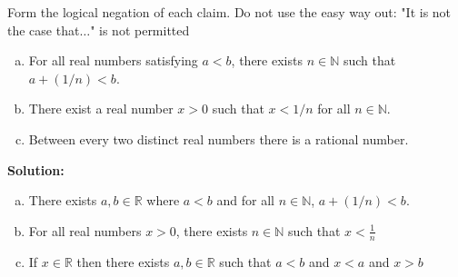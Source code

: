 \documentclass[12pt]{article}
\makeatletter
\theoremstyle{homework}
\newenvironment{exercise}[1]
{\def\@currentlabel{#1}\exercisecore}
{\endexercisecore}
\newcommand{\localhead}[1]{\par\smallskip\noindent\textbf{#1}\nobreak\\}%
\newcommand\solution{\localhead{Solution:}}
\newcommand{\Reals}{\ensuremath{\mathbb R}}
\newcommand{\Nats}{\ensuremath{\mathbb N}}
\let\RR\Reals
\let\NN\Nats
\makeatother
\begin{document}
\begin{exercise}{1.2.11}
  Form the logical negation of each claim. Do not use the easy way out: "It is not the case that$\ldots$" 
  is not permitted
  \begin{enumerate}[(a)]
  \item For all real numbers satisfying $a<b$, there exists $n\in\Nats$ such that $a+(1/n)<b$.
  \item There exist a real number $x>0$ such that $x<1/n$ for all $n\in\Nats$.
  \item Between every two distinct real numbers there is a rational number.
  \end{enumerate}
  \end{exercise}
  \solution
  \begin{enumerate}[(a)]
  \item There exists $a,b \in \RR$ where $a<b$ and for all $n \in \Nats$, $a+(1/n)<b$.
  \item For all real numbers $x > 0$, there exists $n \in \NN$ such that $x < \frac{1}{n}$
  \item If $x \in \RR$ then there exists $a,b \in \RR$ such that $a<b$ and $x < a$ and $x > b$ 
  \end{enumerate}
  \vspace{1in}
\end{document}
